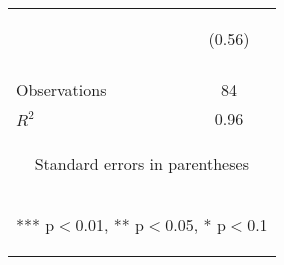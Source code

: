\begin{center}
\begin{tabular}{lc}
 & \begin{footnotesize}(0.56)\end{footnotesize} \\
\vspace{4pt} & \begin{footnotesize}\end{footnotesize} \\
Observations & 84 \\
 $R^2$ & 0.96 \\ \hline
\multicolumn{2}{c}{\begin{footnotesize} Standard errors in parentheses\end{footnotesize}} \\
\multicolumn{2}{c}{\begin{footnotesize} *** p$<$0.01, ** p$<$0.05, * p$<$0.1\end{footnotesize}} \\
\end{tabular}
\end{center}
